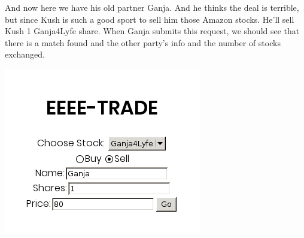 And now here we have his old partner Ganja. And he thinks the deal is terrible, but since Kush is such a good sport to sell him those Amazon stocks. He'll sell Kush 1 Ganja4\+Lyfe share. When Ganja submits this request, we should see that there is a match found and the other party's info and the number of stocks exchanged.

 
\includegraphics[scale=0.5]{../test13.png}
 